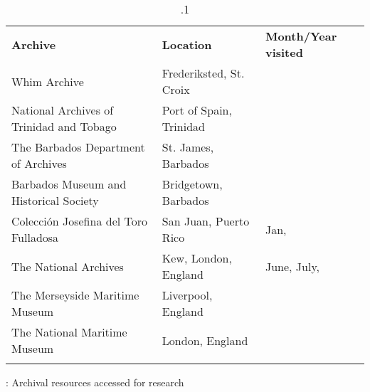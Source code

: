 \begin{table}\begin{tabularx}{\textwidth}{XXX}
\lsptoprule

\textbf{Archive} & \textbf{Location} & \textbf{Month/Year} \textbf{visited}\\
Whim Archive & Frederiksted, St. Croix & \citealt{May2010}\\
National Archives of Trinidad and Tobago & Port of Spain, Trinidad & \citealt{July2012}\\
The Barbados Department of Archives & St. James, Barbados & \citealt{July2013}\\
Barbados Museum and Historical Society & Bridgetown, Barbados & \citealt{July2013}\\
Colección Josefina del Toro Fulladosa & San Juan, Puerto Rico & Jan, \citealt{Feb2014}\\
The National Archives & Kew, London, England & June, July, \citealt{Nov2015}\\
The Merseyside Maritime Museum & Liverpool, England & \citealt{July2015}\\
The National Maritime Museum & London, England & \citealt{November2015}\\
\lspbottomrule
\end{tabularx}

\caption{\label{tab:key:1}.1}: Archival resources accessed for research
\end{table}



